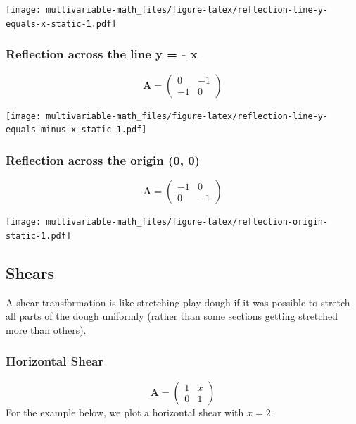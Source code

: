 \documentclass[
]{book}
\theoremstyle{definition}
\theoremstyle{definition}
\theoremstyle{definition}
\theoremstyle{definition}
\theoremstyle{remark}
\begin{document}
\texttt{[image: multivariable-math\_files/figure-latex/reflection-line-y-equals-x-static-1.pdf]}

\hypertarget{reflection-across-the-line-y---x}{%
\subsubsection{Reflection across the line y = - x}\label{reflection-across-the-line-y---x}}

\[
\mathbf{A} = \begin{pmatrix}
0 & -1 \\
-1 & 0
\end{pmatrix}
\]

\texttt{[image: multivariable-math\_files/figure-latex/reflection-line-y-equals-minus-x-static-1.pdf]}

\hypertarget{reflection-across-the-origin-0-0}{%
\subsubsection{Reflection across the origin (0, 0)}\label{reflection-across-the-origin-0-0}}

\[
\mathbf{A} = \begin{pmatrix}
-1 & 0 \\
0 & -1
\end{pmatrix}
\]

\texttt{[image: multivariable-math\_files/figure-latex/reflection-origin-static-1.pdf]}

\hypertarget{shears}{%
\subsection{Shears}\label{shears}}

A shear transformation is like stretching play-dough if it was possible to stretch all parts of the dough uniformly (rather than some sections getting stretched more than others).

\hypertarget{horizontal-shear}{%
\subsubsection{Horizontal Shear}\label{horizontal-shear}}

\[
\mathbf{A} = \begin{pmatrix}
1 & x \\
0 & 1
\end{pmatrix}
\]
For the example below, we plot a horizontal shear with \(x = 2\).
\end{document}
